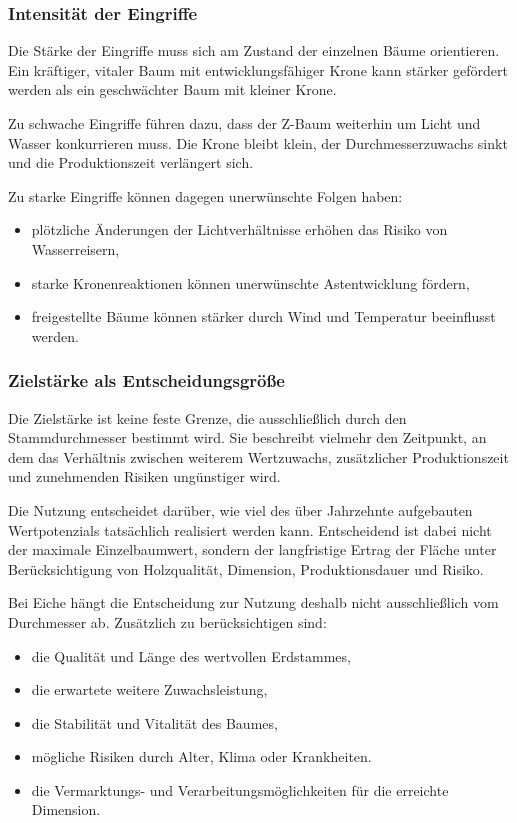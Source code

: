 \documentclass[twocolumn, bibliography=totoc, abstract=true]{scrartcl}
\begin{document}
\subsubsection{Intensität der Eingriffe}

Die Stärke der Eingriffe muss sich am Zustand der einzelnen Bäume orientieren. Ein kräftiger, vitaler Baum mit entwicklungsfähiger Krone kann stärker gefördert werden als ein geschwächter Baum mit kleiner Krone.

Zu schwache Eingriffe führen dazu, dass der Z-Baum weiterhin um Licht und Wasser konkurrieren muss. Die Krone bleibt klein, der Durchmesserzuwachs sinkt und die Produktionszeit verlängert sich.

Zu starke Eingriffe können dagegen unerwünschte Folgen haben:

\begin{itemize}
\item plötzliche Änderungen der Lichtverhältnisse erhöhen das Risiko von Wasserreisern,
\item starke Kronenreaktionen können unerwünschte Astentwicklung fördern,
\item freigestellte Bäume können stärker durch Wind und Temperatur beeinflusst werden.
\end{itemize}

\subsubsection{Zielstärke als Entscheidungsgröße}

Die Zielstärke ist keine feste Grenze, die ausschließlich durch den Stammdurchmesser bestimmt wird. Sie beschreibt vielmehr den Zeitpunkt, an dem das Verhältnis zwischen weiterem Wertzuwachs, zusätzlicher Produktionszeit und zunehmenden Risiken ungünstiger wird.

Die Nutzung entscheidet darüber, wie viel des über Jahrzehnte aufgebauten Wertpotenzials tatsächlich realisiert werden kann. Entscheidend ist dabei nicht der maximale Einzelbaumwert, sondern der langfristige Ertrag der Fläche unter Berücksichtigung von Holzqualität, Dimension, Produktionsdauer und Risiko.

Bei Eiche hängt die Entscheidung zur Nutzung deshalb nicht ausschließlich vom Durchmesser ab. Zusätzlich zu berücksichtigen sind:

\begin{itemize}
\item die Qualität und Länge des wertvollen Erdstammes,
\item die erwartete weitere Zuwachsleistung,
\item die Stabilität und Vitalität des Baumes,
\item mögliche Risiken durch Alter, Klima oder Krankheiten.
\item die Vermarktungs- und Verarbeitungsmöglichkeiten für die erreichte Dimension.
\end{itemize}
\end{document}

